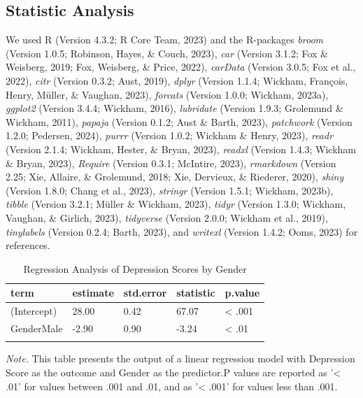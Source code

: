 \documentclass[
  man,floatsintext]{apa6}
\begin{document}
\hypertarget{statistic-analysis}{%
\subsection{Statistic Analysis}\label{statistic-analysis}}

We used R (Version 4.3.2; R Core Team, 2023) and the R-packages \emph{broom} (Version 1.0.5; Robinson, Hayes, \& Couch, 2023), \emph{car} (Version 3.1.2; Fox \& Weisberg, 2019; Fox, Weisberg, \& Price, 2022), \emph{carData} (Version 3.0.5; Fox et al., 2022), \emph{citr} (Version 0.3.2; Aust, 2019), \emph{dplyr} (Version 1.1.4; Wickham, François, Henry, Müller, \& Vaughan, 2023), \emph{forcats} (Version 1.0.0; Wickham, 2023a), \emph{ggplot2} (Version 3.4.4; Wickham, 2016), \emph{lubridate} (Version 1.9.3; Grolemund \& Wickham, 2011), \emph{papaja} (Version 0.1.2; Aust \& Barth, 2023), \emph{patchwork} (Version 1.2.0; Pedersen, 2024), \emph{purrr} (Version 1.0.2; Wickham \& Henry, 2023), \emph{readr} (Version 2.1.4; Wickham, Hester, \& Bryan, 2023), \emph{readxl} (Version 1.4.3; Wickham \& Bryan, 2023), \emph{Require} (Version 0.3.1; McIntire, 2023), \emph{rmarkdown} (Version 2.25; Xie, Allaire, \& Grolemund, 2018; Xie, Dervieux, \& Riederer, 2020), \emph{shiny} (Version 1.8.0; Chang et al., 2023), \emph{stringr} (Version 1.5.1; Wickham, 2023b), \emph{tibble} (Version 3.2.1; Müller \& Wickham, 2023), \emph{tidyr} (Version 1.3.0; Wickham, Vaughan, \& Girlich, 2023), \emph{tidyverse} (Version 2.0.0; Wickham et al., 2019), \emph{tinylabels} (Version 0.2.4; Barth, 2023), and \emph{writexl} (Version 1.4.2; Ooms, 2023) for references.

\begin{table}[tbp]

\begin{center}
\begin{threeparttable}

\caption{\label{tab:regression-depression-gender}Regression Analysis of Depression Scores by Gender}

\begin{tabular}{lllll}
\toprule
term & \multicolumn{1}{c}{estimate} & \multicolumn{1}{c}{std.error} & \multicolumn{1}{c}{statistic} & \multicolumn{1}{c}{p.value}\\
\midrule
(Intercept) & 28.00 & 0.42 & 67.07 & < .001\\
GenderMale & -2.90 & 0.90 & -3.24 & < .01\\
\bottomrule
\addlinespace
\end{tabular}

\begin{tablenotes}[para]
\normalsize{\textit{Note.} This table presents the output of a linear regression model with Depression Score as the outcome and Gender as the predictor.P values are reported as '< .01' for values between .001 and .01, and as '< .001' for values less than .001.}
\end{tablenotes}

\end{threeparttable}
\end{center}

\end{table}
\end{document}
